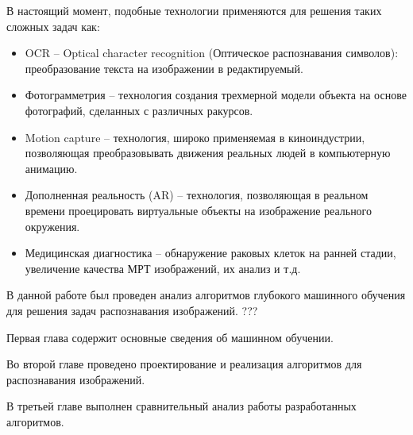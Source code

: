 В настоящий момент, подобные технологии применяются для решения таких сложных задач как:
\begin{itemize}
    \item OCR – Optical character recognition (Оптическое распознавания символов): преобразование текста на изображении в редактируемый.
    \item Фотограмметрия – технология создания трехмерной модели объекта на основе фотографий, сделанных с различных ракурсов.
    \item Motion capture – технология, широко применяемая в киноиндустрии, позволяющая преобразовывать движения реальных людей в компьютерную анимацию.
    \item Дополненная реальность (AR) – технология, позволяющая в реальном времени проецировать виртуальные объекты на изображение реального окружения. 
    \item Медицинская диагностика – обнаружение раковых клеток на ранней стадии, увеличение качества МРТ изображений, их анализ и т.д.
\end{itemize}

В данной работе был проведен анализ алгоритмов глубокого машинного обучения для решения задач распознавания изображений. ???

Первая глава содержит основные сведения об машинном обучении.

Во второй главе проведено проектирование и реализация алгоритмов для распознавания изображений.

В третьей главе выполнен сравнительный анализ работы разработанных алгоритмов.

\clearpage
